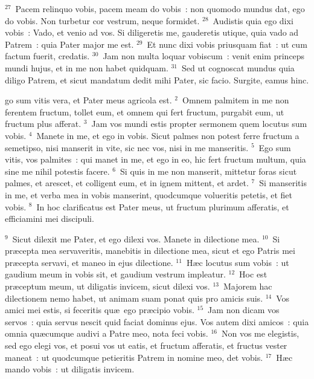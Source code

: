${}^{27}$~Pacem relinquo vobis, pacem meam do vobis~: non quomodo mundus dat, ego do vobis. Non turbetur cor vestrum, neque formidet.
${}^{28}$~Audistis quia ego dixi vobis~: Vado, et venio ad vos. Si diligeretis me, gauderetis utique, quia vado ad Patrem~: quia Pater major me est.
${}^{29}$~Et nunc dixi vobis priusquam fiat~: ut cum factum fuerit, credatis.
${}^{30}$~Jam non multa loquar vobiscum~: venit enim princeps mundi hujus, et in me non habet quidquam.
${}^{31}$~Sed ut cognoscat mundus quia diligo Patrem, et sicut mandatum dedit mihi Pater, sic facio. Surgite, eamus hinc.

\bchapter
{}go sum vitis vera, et Pater meus agricola est.
${}^{2}$~Omnem palmitem in me non ferentem fructum, tollet eum, et omnem qui fert fructum, purgabit eum, ut fructum plus afferat.
${}^{3}$~Jam vos mundi estis propter sermonem quem locutus sum vobis.
${}^{4}$~Manete in me, et ego in vobis. Sicut palmes non potest ferre fructum a semetipso, nisi manserit in vite, sic nec vos, nisi in me manseritis.
${}^{5}$~Ego sum vitis, vos palmites~: qui manet in me, et ego in eo, hic fert fructum multum, quia sine me nihil potestis facere.
${}^{6}$~Si quis in me non manserit, mittetur foras sicut palmes, et arescet, et colligent eum, et in ignem mittent, et ardet.
${}^{7}$~Si manseritis in me, et verba mea in vobis manserint, quodcumque volueritis petetis, et fiet vobis.
${}^{8}$~In hoc clarificatus est Pater meus, ut fructum plurimum afferatis, et efficiamini mei discipuli.


${}^{9}$~Sicut dilexit me Pater, et ego dilexi vos. Manete in dilectione mea.
${}^{10}$~Si pr\ae cepta mea servaveritis, manebitis in dilectione mea, sicut et ego Patris mei pr\ae cepta servavi, et maneo in ejus dilectione.
${}^{11}$~H\ae c locutus sum vobis~: ut gaudium meum in vobis sit, et gaudium vestrum impleatur.
${}^{12}$~Hoc est pr\ae ceptum meum, ut diligatis invicem, sicut dilexi vos.
${}^{13}$~Majorem hac dilectionem nemo habet, ut animam suam ponat quis pro amicis suis.
${}^{14}$~Vos amici mei estis, si feceritis qu\ae\ ego pr\ae cipio vobis.
${}^{15}$~Jam non dicam vos servos~: quia servus nescit quid faciat dominus ejus. Vos autem dixi amicos~: quia omnia qu\ae cumque audivi a Patre meo, nota feci vobis.
${}^{16}$~Non vos me elegistis, sed ego elegi vos, et posui vos ut eatis, et fructum afferatis, et fructus vester maneat~: ut quodcumque petieritis Patrem in nomine meo, det vobis.
${}^{17}$~H\ae c mando vobis~: ut diligatis invicem.


